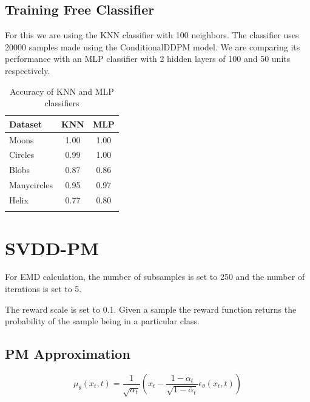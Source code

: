 \documentclass[11pt]{article}
\begin{document}
\subsection{Training Free Classifier}

For this we are using the KNN classifier with 100 neighbors. The classifier uses 20000 samples made using the ConditionalDDPM model.
We are comparing its performance with an MLP classifier with 2 hidden layers of 100 and 50 units respectively.

\begin{longtable}{|l|c|c|}
    \hline
    \textbf{Dataset} & \textbf{KNN} & \textbf{MLP} \\
    \hline
    Moons & 1.00 & 1.00 \\
    Circles & 0.99 & 1.00 \\
    Blobs & 0.87 & 0.86 \\
    Manycircles & 0.95 & 0.97 \\
    Helix & 0.77 & 0.80 \\
    \hline
    \caption{Accuracy of KNN and MLP classifiers}
\end{longtable}

\section{SVDD-PM}
For EMD calculation, the number of subsamples is set to 250 and the number of iterations is set to 5.

The reward scale is set to 0.1. Given a sample the reward function returns the probability of the sample being in a particular class.

\subsection{PM Approximation}
\[
\mu_\theta(x_t, t) = \frac{1}{\sqrt{\alpha_t}} \left( x_t - \frac{1-\alpha_t}{\sqrt{1-\bar{\alpha}_t}} \epsilon_\theta(x_t, t) \right)
\]
\end{document}

